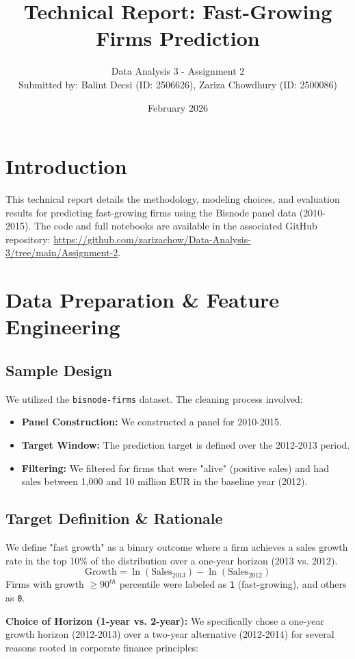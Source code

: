 \documentclass[11pt,a4paper]{article}
\title{\textbf{Technical Report: Fast-Growing Firms Prediction}}
\author{Data Analysis 3 - Assignment 2 \\ Submitted by: Balint Decsi (ID: 2506626), Zariza Chowdhury (ID: 2500086)}
\date{February 2026}
\begin{document}
\maketitle

\section{Introduction}
This technical report details the methodology, modeling choices, and evaluation results for predicting fast-growing firms using the Bisnode panel data (2010-2015). The code and full notebooks are available in the associated GitHub repository: \url{https://github.com/zarizachow/Data-Analysis-3/tree/main/Assignment-2}.

\section{Data Preparation \& Feature Engineering}

\subsection{Sample Design}
We utilized the \texttt{bisnode-firms} dataset. The cleaning process involved:
\begin{itemize}
    \item \textbf{Panel Construction:} We constructed a panel for 2010-2015.
    \item \textbf{Target Window:} The prediction target is defined over the 2012-2013 period.
    \item \textbf{Filtering:} We filtered for firms that were "alive" (positive sales) and had sales between 1,000 and 10 million EUR in the baseline year (2012).
\end{itemize}

\subsection{Target Definition \& Rationale}
We define "fast growth" as a binary outcome where a firm achieves a sales growth rate in the top 10\% of the distribution over a one-year horizon (2013 vs. 2012).
\[ \text{Growth} = \ln(\text{Sales}_{2013}) - \ln(\text{Sales}_{2012}) \]
Firms with growth $\ge 90^{th}$ percentile were labeled as \texttt{1} (fast-growing), and others as \texttt{0}.

\textbf{Choice of Horizon (1-year vs. 2-year):}
We specifically chose a one-year growth horizon (2012-2013) over a two-year alternative (2012-2014) for several reasons rooted in corporate finance principles:
\end{document}
